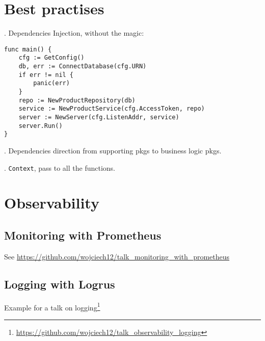 \documentclass[11pt, letterpaper]{article}
\begin{document}
\section{Best practises}

. Dependencies Injection, without the magic:

\begin{verbatim}
func main() {  
    cfg := GetConfig()
    db, err := ConnectDatabase(cfg.URN)
    if err != nil {
        panic(err)
    }
    repo := NewProductRepository(db)
    service := NewProductService(cfg.AccessToken, repo)
    server := NewServer(cfg.ListenAddr, service)
    server.Run()
}
\end{verbatim}

. Dependencies direction from supporting pkgs to business logic pkgs.

. \verb|Context|, pass to all the functions.

\section{Observability}

\subsection{Monitoring with Prometheus}

See \href{https://github.com/wojciech12/talk_monitoring_with_prometheus}{https://github.com/wojciech12/talk\_monitoring\_with\_prometheus}

\subsection{Logging with Logrus}

Example for a talk on logging\footnote{\href{https://github.com/wojciech12/talk_observability_logging}{https://github.com/wojciech12/talk\_observability\_logging}}
\end{document}
